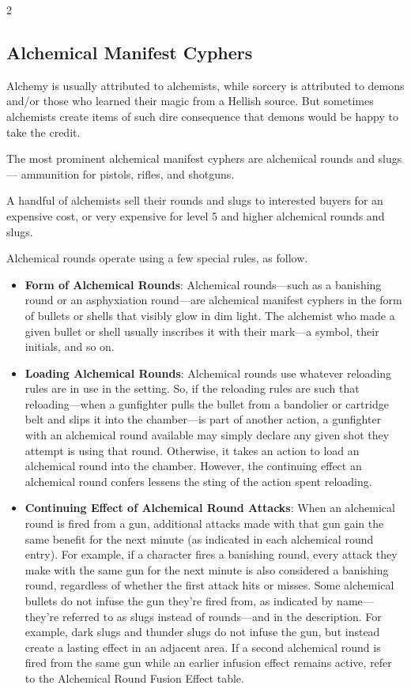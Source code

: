 \begin{multicols}{2}
\subsection{Alchemical Manifest Cyphers}
 
Alchemy is usually attributed to alchemists, while sorcery is attributed to demons and/or those who learned their magic from a Hellish source. But sometimes alchemists create items of such dire consequence that demons would be happy to take the credit.

The most prominent alchemical manifest cyphers are alchemical rounds and slugs— ammunition for pistols, rifles, and shotguns. 

A handful of alchemists sell their rounds and slugs to interested buyers for an expensive cost, or very expensive for level 5 and higher alchemical rounds and slugs. 

Alchemical rounds operate using a few special rules, as follow. 

\begin{itemize}
\item \textbf{Form of Alchemical Rounds}: Alchemical rounds—such as a banishing round or an asphyxiation round—are alchemical manifest cyphers in the form of bullets or shells that visibly glow in dim light. The alchemist who made a given bullet or shell usually inscribes it with their mark—a symbol, their initials, and so on. 
\item \textbf{Loading Alchemical Rounds}: Alchemical rounds use whatever reloading rules are in use in the setting. So, if the reloading rules are such that reloading—when a gunfighter pulls the bullet from a bandolier or cartridge belt and slips it into the chamber—is part of another action, a gunfighter with an alchemical round available may simply declare any given shot they attempt is using that round. Otherwise, it takes an action to load an alchemical round into the chamber. However, the continuing effect an alchemical round confers lessens the sting of the action spent reloading. 
\item \textbf{Continuing Effect of Alchemical Round Attacks}: When an alchemical round is fired from a gun, additional attacks made with that gun gain the same benefit for the next minute (as indicated in each alchemical round entry). For example, if a character fires a banishing round, every attack they make with the same gun for the next minute is also considered a banishing round, regardless of whether the first attack hits or misses. Some alchemical bullets do not infuse the gun they’re fired from, as indicated by name—they’re referred to as slugs instead of rounds—and in the description. For example, dark slugs and thunder slugs do not infuse the gun, but instead create a lasting effect in an adjacent area. If a second alchemical round is fired from the same gun while an earlier infusion effect remains active, refer to the Alchemical Round Fusion Effect table.
\end{itemize}

\end{multicols}

